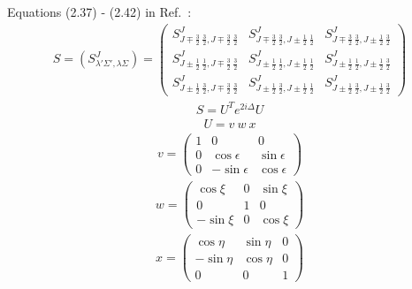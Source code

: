 \documentclass[11pt,aps]{revtex4}
\begin{document}
Equations (2.37) - (2.42) in Ref.~\cite{Huber:1995zza}:
\begin{equation}
\begin{split}
S=(S^J_{\lambda'\Sigma', \lambda\Sigma})
=\begin{pmatrix}
S^J_{J\mp\frac3 2\ \frac3 2,J\mp\frac3 2\ \frac3 2} & S^J_{J\mp\frac3 2\ \frac3 2,J\pm\frac1 2\ \frac1 2} &  S^J_{J\mp\frac3 2\ \frac3 2,J\pm\frac1 2\ \frac3 2}\\
S^J_{J\pm\frac1 2\ \frac1 2,J\mp\frac3 2\ \frac3 2} & S^J_{J\pm\frac1 2\ \frac1 2,J\pm\frac1 2\ \frac1 2} &  S^J_{J\pm\frac1 2\ \frac1 2,J\pm\frac1 2\ \frac3 2}\\
S^J_{J\pm\frac1 2\ \frac3 2,J\mp\frac3 2\ \frac3 2} & S^J_{J\pm\frac1 2\ \frac3 2,J\pm\frac1 2\ \frac1 2} &  S^J_{J\pm\frac1 2\ \frac3 2,J\pm\frac1 2\ \frac3 2}
\end{pmatrix}
\end{split}
\end{equation}
\begin{equation}
\begin{split}
S=U^T e^{2i\Delta} U
\end{split}
\end{equation}
\begin{equation}
\begin{split}
U=v\ w\ x
\end{split}
\end{equation}
\begin{equation}
\begin{split}
v=
\begin{pmatrix}
1 & 0 & 0 \\
0 & \cos \epsilon & \sin \epsilon\\
0 & -\sin \epsilon & \cos \epsilon
\end{pmatrix}
\end{split}
\end{equation}
\begin{equation}
\begin{split}
w=
\begin{pmatrix}
\cos \xi & 0 & \sin \xi\\
0 & 1 & 0\\
-\sin \xi & 0 & \cos \xi
\end{pmatrix}
\end{split}
\end{equation}
\begin{equation}
\begin{split}
x=
\begin{pmatrix}
\cos \eta & \sin \eta & 0\\
-\sin \eta & \cos \eta & 0\\
0 & 0 & 1
\end{pmatrix}
\end{split}
\end{equation}
\end{document}
